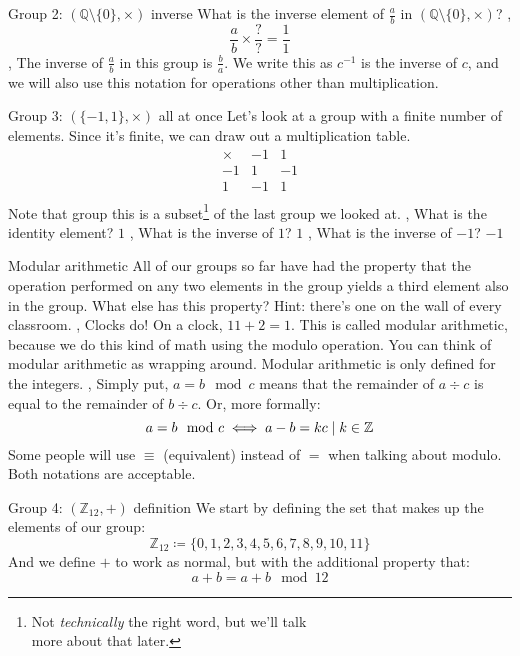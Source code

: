 \begin{namedframe}{Group 2: $(\mathbb{Q} \setminus \{0\}, \times)$ inverse}
	What is the inverse element of $\frac{a}{b}$ in $(\mathbb{Q} \setminus \{0\}, \times)$?
	\sep
	\[\frac{a}{b} \times \frac{?}{?} = \frac{1}{1}\]
	\sep
	The inverse of $\frac{a}{b}$ in this group is $\frac{b}{a}$.
	\vertspace
	We write this as $c^{-1}$ is the inverse of $c$, and we will also use this notation for operations other than multiplication.
\end{namedframe}
\begin{namedframe}{Group 3: $(\{-1, 1\}, \times)$ all at once}
	Let's look at a group with a finite number of elements. Since it's finite, we can draw out a multiplication table.
	\begin{equation*}
		\begin{array}{r|rr}
			\times & -1 & 1 \\\hline
			-1     &  1 & -1\\
			1      & -1 & 1 \\
		\end{array}
	\end{equation*}
	Note that group this is a subset\footnote{Not \textit{technically} the right word, but we'll talk\\more about that later.} of the last group we looked at.
	\sep
	What is the identity element? \pause $1$
	\sep
	What is the inverse of $1$? \pause $1$
	\sep
	What is the inverse of $-1$? \pause $-1$
\end{namedframe}
\begin{namedframe}{Modular arithmetic}
	All of our groups so far have had the property that the operation performed on any two elements in the group yields a third element also in the group. What else has this property? \pause Hint: there's one on the wall of every classroom.
	\sep
	Clocks do! On a clock, $11 + 2 = 1$. This is called modular arithmetic, because we do this kind of math using the modulo operation. You can think of modular arithmetic as wrapping around. Modular arithmetic is only defined for the integers.
	\sep
	Simply put, $a = b \mod c$ means that the remainder of $a \div c$ is equal to the remainder of $b \div c$. Or, more formally:
	\[a = b \mod c \iff a - b = kc \mid k \in \mathbb{Z}\]
	Some people will use $\equiv$ (equivalent) instead of $=$ when talking about modulo. Both notations are acceptable.
\end{namedframe}
\begin{namedframe}{Group 4: $(\mathbb{Z}_{12}, +)$ definition}
	We start by defining the set that makes up the elements of our group:
	\[\mathbb{Z}_{12} \coloneqq \{0, 1, 2, 3, 4, 5, 6, 7, 8, 9, 10, 11\}\]
	And we define $+$ to work as normal, but with the additional property that:
	\[a + b = a + b \mod 12\]
\end{namedframe}
